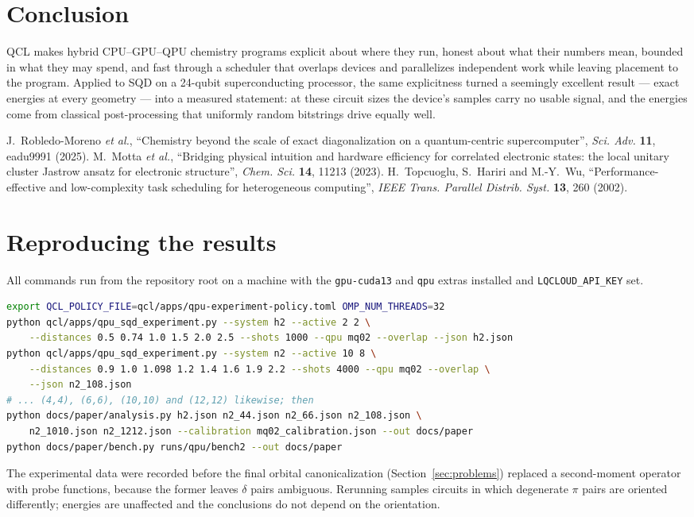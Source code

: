 \documentclass[10pt]{article}
\newcommand{\qcl}{QCL}
\newcommand{\code}[1]{\texttt{#1}}
\begin{document}
\section{Conclusion}

\qcl{} makes hybrid CPU--GPU--QPU chemistry programs explicit about where they run,
honest about what their numbers mean, bounded in what they may spend, and fast through a
scheduler that overlaps devices and parallelizes independent work while leaving
placement to the program. Applied to SQD on a 24-qubit superconducting processor, the
same explicitness turned a seemingly excellent result --- exact energies at every
geometry --- into a measured statement: at these circuit sizes the device's samples
carry no usable signal, and the energies come from classical post-processing that
uniformly random bitstrings drive equally well.

\begin{thebibliography}{9}
 J.~Robledo-Moreno \emph{et al.}, ``Chemistry beyond the scale of exact
diagonalization on a quantum-centric supercomputer'', \emph{Sci. Adv.} \textbf{11},
eadu9991 (2025).
 M.~Motta \emph{et al.}, ``Bridging physical intuition and hardware
efficiency for correlated electronic states: the local unitary cluster Jastrow
ansatz for electronic structure'', \emph{Chem. Sci.} \textbf{14}, 11213 (2023).
 H.~Topcuoglu, S.~Hariri and M.-Y.~Wu, ``Performance-effective and
low-complexity task scheduling for heterogeneous computing'', \emph{IEEE Trans.
Parallel Distrib. Syst.} \textbf{13}, 260 (2002).
\end{thebibliography}

\appendix
\section{Reproducing the results}

All commands run from the repository root on a machine with the \code{gpu-cuda13} and
\code{qpu} extras installed and \code{LQCLOUD\_API\_KEY} set.
\begin{lstlisting}[language=bash]
export QCL_POLICY_FILE=qcl/apps/qpu-experiment-policy.toml OMP_NUM_THREADS=32
python qcl/apps/qpu_sqd_experiment.py --system h2 --active 2 2 \
    --distances 0.5 0.74 1.0 1.5 2.0 2.5 --shots 1000 --qpu mq02 --overlap --json h2.json
python qcl/apps/qpu_sqd_experiment.py --system n2 --active 10 8 \
    --distances 0.9 1.0 1.098 1.2 1.4 1.6 1.9 2.2 --shots 4000 --qpu mq02 --overlap \
    --json n2_108.json
# ... (4,4), (6,6), (10,10) and (12,12) likewise; then
python docs/paper/analysis.py h2.json n2_44.json n2_66.json n2_108.json \
    n2_1010.json n2_1212.json --calibration mq02_calibration.json --out docs/paper
python docs/paper/bench.py runs/qpu/bench2 --out docs/paper
\end{lstlisting}
The experimental data were recorded before the final orbital canonicalization
(Section~\ref{sec:problems}) replaced a second-moment operator with probe functions,
because the former leaves $\delta$ pairs ambiguous. Rerunning samples circuits in which
degenerate $\pi$ pairs are oriented differently; energies are unaffected and the
conclusions do not depend on the orientation.
\end{document}
